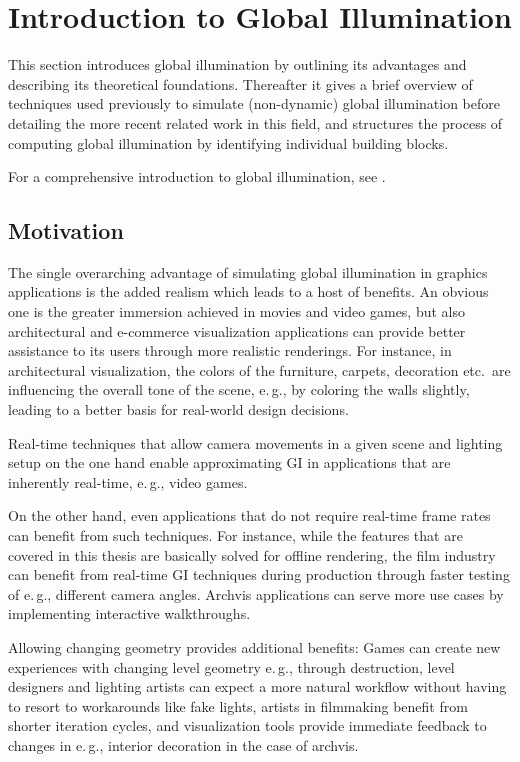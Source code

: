 \section{Introduction to Global Illumination}

This section introduces global illumination by outlining its advantages and describing its theoretical foundations. Thereafter it gives a brief overview of techniques used previously to simulate (non-dynamic) global illumination before detailing the more recent related work in this field, and structures the process of computing global illumination by identifying individual building blocks.

For a comprehensive introduction to global illumination, see \citet{Ritschel:2012:GISTAR}.

\subsection{Motivation}
The single overarching advantage of simulating global illumination in graphics applications is the added realism which leads to a host of benefits. An obvious one is the greater immersion achieved in movies and video games, but also architectural and e-commerce visualization applications can provide better assistance to its users through more realistic renderings. For instance, in architectural visualization, the colors of the furniture, carpets, decoration etc.\ are influencing the overall tone of the scene, e.\,g., by coloring the walls slightly, leading to a better basis for real-world design decisions.

Real-time techniques that allow camera movements in a given scene and lighting setup on the one hand enable approximating GI in applications that are inherently real-time, e.\,g., video games.

On the other hand, even applications that do not require real-time frame rates can benefit from such techniques. For instance, while the features that are covered in this thesis are basically solved for offline rendering, the film industry can benefit from real-time GI techniques during production through faster testing of e.\,g., different camera angles. Archvis applications can serve more use cases by implementing interactive walkthroughs.

Allowing changing geometry provides additional benefits: Games can create new experiences with changing level geometry e.\,g., through destruction, level designers and lighting artists can expect a more natural workflow without having to resort to workarounds like fake lights, artists in filmmaking benefit from shorter iteration cycles, and visualization tools provide immediate feedback to changes in e.\,g., interior decoration in the case of archvis.


